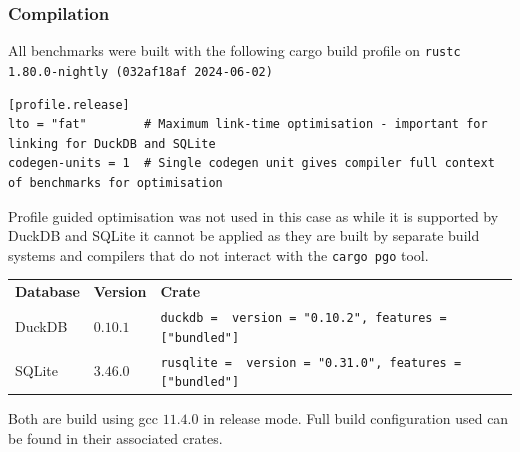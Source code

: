 \subsubsection{Compilation}
All benchmarks were built with the following cargo build profile on \texttt{rustc 1.80.0-nightly (032af18af 2024-06-02)}
\begin{verbatim}
[profile.release]
lto = "fat"        # Maximum link-time optimisation - important for linking for DuckDB and SQLite 
codegen-units = 1  # Single codegen unit gives compiler full context of benchmarks for optimisation
\end{verbatim}
Profile guided optimisation was not used in this case as while it is supported by DuckDB and SQLite it cannot be applied as they are built by separate build systems and compilers that do not interact with the \texttt{cargo pgo}\cite{Cargopgo} tool.
\begin{center}
    \begin{tabular}{l l l }
        \textbf{Database} & \textbf{Version} & \textbf{Crate}                                                               \\
        DuckDB            & $0.10.1$         & \texttt{duckdb =   { version = "0.10.2", features = ["bundled"] }} \\
        SQLite            & $3.46.0$         & \texttt{rusqlite = { version = "0.31.0", features = ["bundled"] }} \\
    \end{tabular}
\end{center}
Both are build using gcc $11.4.0$ in release mode. Full build configuration used can be found in their associated crates.
